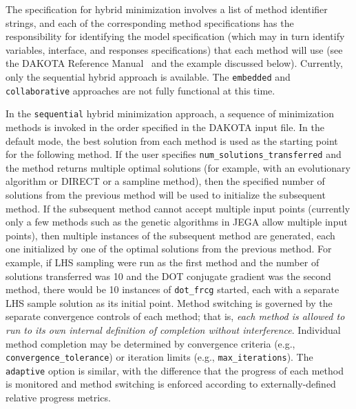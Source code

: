 The specification for hybrid minimization involves a list of
method identifier strings, and each of the corresponding method
specifications has the responsibility for identifying the model
specification (which may in turn identify variables, interface, and
responses specifications) that each method will use (see the DAKOTA
Reference Manual~\cite{RefMan} and the example discussed below).
Currently, only the sequential hybrid approach is available. The
\texttt{embedded} and \texttt{collaborative} approaches are
not fully functional at this time.

In the \texttt{sequential} hybrid minimization approach, a sequence
of minimization methods is invoked in the order specified in the
DAKOTA input file. In the default mode, 
the best solution from each method is used as the
starting point for the following method. If the user specifies
\texttt{num\_solutions\_transferred} and the method returns multiple 
optimal solutions (for example, with an evolutionary algorithm or DIRECT or 
a sampline method), then the specified number of solutions from the previous 
method will be used to initialize the subsequent method.  If the subsequent 
method cannot accept multiple input points (currently only a few methods 
such as the genetic algorithms in JEGA allow multiple input points), then 
multiple instances of the subsequent method are generated, each one 
initialized by one of the optimal solutions from the previous method. 
For example, if LHS sampling were run as the first method and 
the number of solutions transferred was 10 and the DOT conjugate gradient 
was the second method, there would be 10 instances of \texttt{dot\_frcg} 
started, each with a separate LHS sample solution as its initial point. 
Method switching is governed
by the separate convergence controls of each method; that is,
\emph{each method is allowed to run to its own internal definition of
completion without interference}. Individual method completion may be
determined by convergence criteria (e.g.,
\texttt{convergence\_tolerance}) or iteration limits (e.g.,
\texttt{max\_iterations}).  The \texttt{adaptive} option
is similar, with the difference that the progress of each method is
monitored and method switching is enforced according to
externally-defined relative progress metrics.  


